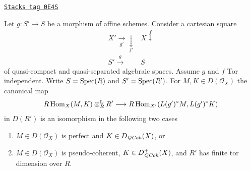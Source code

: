 \begin{lemma}
\label{spaces-perfect-lemma-affine-morphism-and-hom-out-of-perfect}
\href{https://stacks.math.columbia.edu/tag/0E4S}{\texttt{Stacks tag 0E4S}}

Let $g : S' \to S$ be a morphism of affine schemes.
Consider a cartesian square
$$
\begin{array}{cc}X' \underset{g'}{\longrightarrow}\underset{f'}{\downarrow} & X \overset{f}{\downarrow} \\ S' \overset{g}{\longrightarrow} & S\end{array}
$$
of quasi-compact and quasi-separated algebraic spaces. Assume $g$ and $f$
Tor independent. Write $S = \operatorname{Spec}(R)$ and $S' = \operatorname{Spec}(R')$. For
$M, K \in D(\mathcal{O}_X)$ the canonical map
$$
R\operatorname{Hom}_X(M, K) \otimes^\mathbf{L}_R R'
\longrightarrow
R\operatorname{Hom}_{X'}(L(g')^*M, L(g')^*K)
$$
in $D(R')$ is an isomorphism in the following two cases
\begin{enumerate}
\item $M \in D(\mathcal{O}_X)$ is perfect and $K \in D_{\mathit{QCoh}}(X)$, or
\item $M \in D(\mathcal{O}_X)$ is pseudo-coherent,
$K \in D_{\mathit{QCoh}}^+(X)$, and $R'$ has finite tor dimension over $R$.
\end{enumerate}
\end{lemma}

